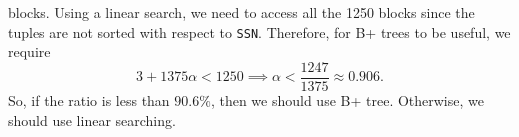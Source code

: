 \documentclass[a4paper, openany]{memoir}
\begin{document}
blocks. Using a linear search, we need to access all the 1250 blocks since the tuples are not sorted with respect to \texttt{SSN}. Therefore, for B+ trees to be useful, we require 
\[3 + 1375 \alpha < 1250 \implies \alpha < \frac{1247}{1375} \approx 0.906.\]
So, if the ratio is less than $90.6\%$, then we should use B+ tree. Otherwise, we should use linear searching. 
\end{document}

